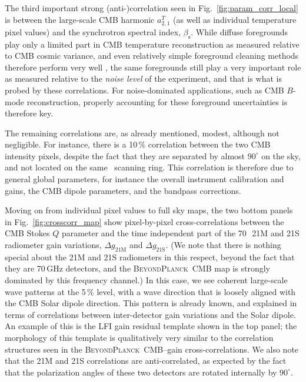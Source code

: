 \documentclass[twocolumn]{aa}
\newcommand{\BP}{\textsc{BeyondPlanck}}
\begin{document}
The third important strong (anti-)correlation seen in
Fig.~\ref{fig:param_corr_local} is between the large-scale CMB
harmonic $a_{2,1}^T$ (as well as individual temperature pixel values)
and the synchrotron spectral index, $\beta_{\mathrm{s}}$. While
diffuse foregrounds play only a limited part in CMB temperature
reconstruction as measured relative to CMB cosmic variance, and even
relatively simple foreground cleaning methods therefore perform very
well \citep[e.g.,][]{bennett2012,planck2016-l04}, the same foregrounds
still play a very important role as measured relative to the \emph{noise
level} of the experiment, and that is what is probed by these
correlations. For noise-dominated applications, such as CMB $B$-mode
reconstruction, properly accounting for these foreground uncertainties
is therefore key.

The remaining correlations are, as already mentioned, modest, although
not negligible. For instance, there is a 10\,\% correlation between
the two CMB intensity pixels, despite the fact that they are separated
by almost $90^{\circ}$ on the sky, and not located on the same
\Planck\ scanning ring. This correlation is therefore due to general
global parameters, for instance the overall instrument calibration and
gains, the CMB dipole parameters, and the bandpass corrections.

Moving on from individual pixel values to full sky maps, the two
bottom panels in Fig.~\ref{fig:crosscorr_map} show pixel-by-pixel
cross-correlations between the CMB Stokes $Q$ parameter and the
time independent part of the 70\,\GHz\ 21M and 21S radiometer gain variations,
$\Delta g_{\mathrm{21M}}$ and $\Delta g_{\mathrm{21S}}$. (We note that
there is nothing special about the 21M and 21S radiometers in this
respect, beyond the fact that they are 70\,GHz detectors, and the
\BP\ CMB map is strongly dominated by this frequency channel.) In this
case, we see coherent large-scale wave patterns at the 5\,\% level,
with a wave direction that is loosely aligned with the CMB Solar
dipole direction. This pattern is already known, and explained in
terms of correlations between inter-detector gain variations and the
Solar dipole. An example of this is the LFI gain residual template
\citep{planck2016-l02} shown in the top panel; the morphology of this
template is qualitatively very similar to the correlation structures
seen in the \BP\ CMB--gain cross-correlations. We also note that the
21M and 21S correlations are anti-correlated, as expected by the fact
that the polarization angles of these two detectors are rotated
internally by $90^{\circ}$. 
\end{document}
